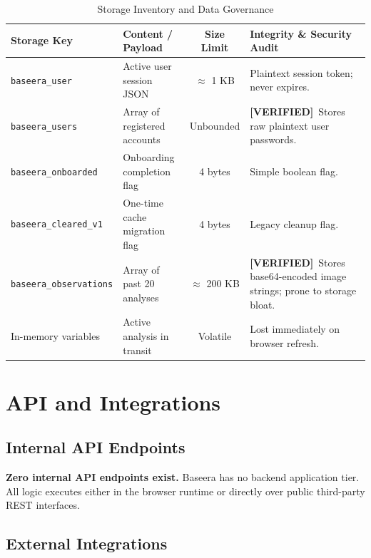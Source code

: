 \documentclass[10pt,a4paper]{report}
\newcommand{\verified}{\colorbox{green!15}{\textcolor{passGreen}{\bfseries\scriptsize [VERIFIED]}}}
\begin{document}
\begin{table}[htbp]
\centering
\small
\caption{Storage Inventory and Data Governance}
\begin{tabularx}{\textwidth}{l p{4.5cm} c X}
\toprule
\textbf{Storage Key} & \textbf{Content / Payload} & \textbf{Size Limit} & \textbf{Integrity \& Security Audit} \\
\midrule
\texttt{baseera\_user} & Active user session JSON & $\approx$ 1 KB & Plaintext session token; never expires. \\
\texttt{baseera\_users} & Array of registered accounts & Unbounded & \verified\ Stores raw plaintext user passwords. \\
\texttt{baseera\_onboarded} & Onboarding completion flag & 4 bytes & Simple boolean flag. \\
\texttt{baseera\_cleared\_v1} & One-time cache migration flag & 4 bytes & Legacy cleanup flag. \\
\texttt{baseera\_observations} & Array of past 20 analyses & $\approx$ 200 KB & \verified\ Stores base64-encoded image strings; prone to storage bloat. \\
In-memory variables & Active analysis in transit & Volatile & Lost immediately on browser refresh. \\
\bottomrule
\end{tabularx}
\end{table}

\chapter{API and Integrations}

\section{Internal API Endpoints}
\textbf{Zero internal API endpoints exist.} Baseera has no backend application tier. All logic executes either in the browser runtime or directly over public third-party REST interfaces.

\section{External Integrations}
\end{document}
